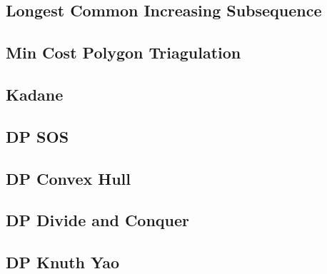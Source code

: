 \subsection{Longest Common Increasing Subsequence}


% 

% 

\subsection{Min Cost Polygon Triagulation}


\subsection{Kadane}


\subsection{DP SOS}


\subsection{DP Convex Hull}


\subsection{DP Divide and Conquer}


\subsection{DP Knuth Yao}


